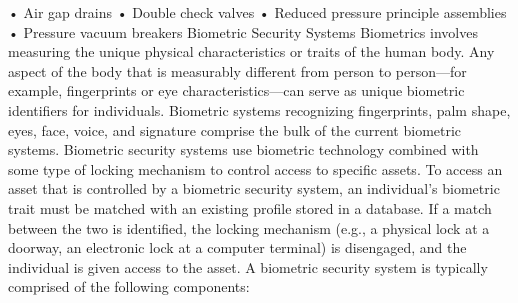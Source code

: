 \documentclass{article}
\begin{document}
• Air gap drains • Double check valves • Reduced pressure principle
assemblies • Pressure vacuum breakers Biometric Security Systems
Biometrics involves measuring the unique physical characteristics or
traits of the human body. Any aspect of the body that is measurably
different from person to person---for example, fingerprints or eye
characteristics---can serve as unique biometric identifiers for
individuals. Biometric systems recognizing fingerprints, palm shape,
eyes, face, voice, and signature comprise the bulk of the current
biometric systems. Biometric security systems use biometric technology
combined with some type of locking mechanism to control access to
specific assets. To access an asset that is controlled by a biometric
security system, an individual's biometric trait must be matched with an
existing profile stored in a database. If a match between the two is
identified, the locking mechanism (e.g., a physical lock at a doorway,
an electronic lock at a computer terminal) is disengaged, and the
individual is given access to the asset. A biometric security system is
typically comprised of the following components:
\end{document}
